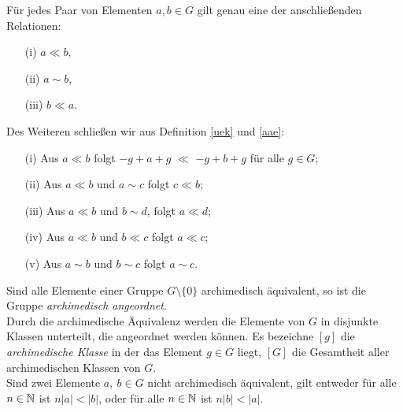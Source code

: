 \begin{folg}
Für jedes Paar von Elementen $a, b \in G$ gilt genau eine der anschließenden Relationen: 
\begin{multicols}{3}
\begin{enumerate}
\item[(i)] $a \ll b$, 
\item[(ii)] $a \sim b$,
\item[(iii)] $b \ll a$. 
\end{enumerate}
\end{multicols}
%
Des Weiteren schließen wir aus Definition \ref{uek} und \ref{aae}:
\begin{enumerate}
\item[(i)] Aus $a \ll b$ folgt $-g+a+g $ $\ll$ $-g+b+g$ für alle $g \in G$;
\item[(ii)] Aus $a \ll b$ und $a \sim c$ folgt $c \ll b$;
\item[(iii)] Aus $a \ll b$ und $b \sim d$, folgt $a \ll d$;
\item[(iv)] Aus $a \ll b$ und $b \ll c$ folgt $a \ll c$;
\item[(v)] Aus $a \sim b$ und $b \sim c$ folgt $a \sim c$.
\end{enumerate}
Sind alle Elemente einer Gruppe $G\setminus\lbrace 0 \rbrace$ archimedisch äquivalent, so ist die Gruppe \textit{archimedisch angeordnet}. \\ 
Durch die archimedische Äquivalenz werden die Elemente von $G$ in disjunkte Klassen unterteilt, die angeordnet werden können. Es bezeichne $[g]$ die \textit{archimedische Klasse} in der das Element $g \in G$ liegt, $[G]$ die Gesamtheit aller archimedischen Klassen von $G$. \label{archimedischeKlassen}\\
Sind zwei Elemente $a,~b \in G$ nicht archimedisch äquivalent, gilt entweder für alle
$n \in \mathbb{N}$ ist $n|a|<|b|$, oder für alle $n \in \mathbb{N}$ ist $n|b| <|a|$.
\end{folg}
%
%
%
